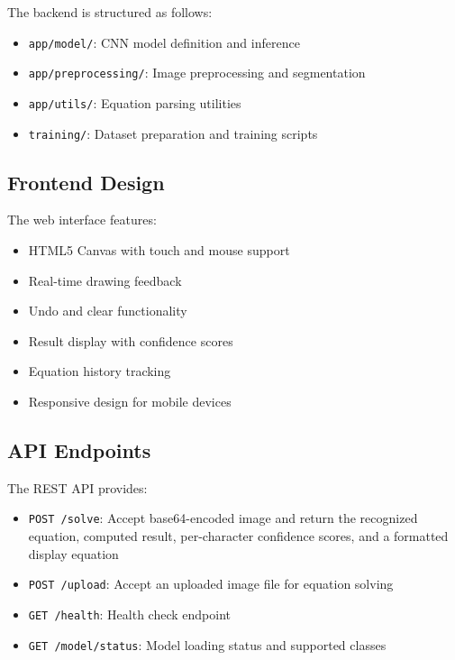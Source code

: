 \documentclass[conference]{IEEEtran}
\begin{document}
The backend is structured as follows:

\begin{itemize}
    \item \texttt{app/model/}: CNN model definition and inference
    \item \texttt{app/preprocessing/}: Image preprocessing and segmentation
    \item \texttt{app/utils/}: Equation parsing utilities
    \item \texttt{training/}: Dataset preparation and training scripts
\end{itemize}

\subsection{Frontend Design}

The web interface features:

\begin{itemize}
    \item HTML5 Canvas with touch and mouse support
    \item Real-time drawing feedback
    \item Undo and clear functionality
    \item Result display with confidence scores
    \item Equation history tracking
    \item Responsive design for mobile devices
\end{itemize}

\subsection{API Endpoints}

The REST API provides:

\begin{itemize}
    \item \texttt{POST /solve}: Accept base64-encoded image and return the recognized equation, computed result, per-character confidence scores, and a formatted display equation
    \item \texttt{POST /upload}: Accept an uploaded image file for equation solving
    \item \texttt{GET /health}: Health check endpoint
    \item \texttt{GET /model/status}: Model loading status and supported classes
\end{itemize}
\end{document}
